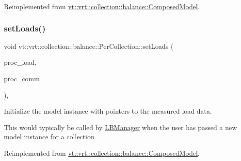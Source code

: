 Reimplemented from \hyperlink{classvt_1_1vrt_1_1collection_1_1balance_1_1_composed_model_a9410479ba5a5950fd56bb076717e48e5}{vt\+::vrt\+::collection\+::balance\+::\+Composed\+Model}.

\mbox{\label{structvt_1_1vrt_1_1collection_1_1balance_1_1_per_collection_aba8f472fbe40c44c9f0f9028afe29cfc}} 
\subsubsection{\texorpdfstring{set\+Loads()}{setLoads()}}
{\footnotesize\ttfamily void vt\+::vrt\+::collection\+::balance\+::\+Per\+Collection\+::set\+Loads (\begin{DoxyParamCaption}\item[{std\+::unordered\+\_\+map$<$ \hyperlink{namespacevt_a46ce6733d5cdbd735d561b7b4029f6d7}{Phase\+Type}, \hyperlink{namespacevt_1_1vrt_1_1collection_1_1balance_a5339303db2e1ce964d783a53fd74e6b1}{Load\+Map\+Type} $>$ const $\ast$}]{proc\+\_\+load,  }\item[{std\+::unordered\+\_\+map$<$ \hyperlink{namespacevt_a46ce6733d5cdbd735d561b7b4029f6d7}{Phase\+Type}, \hyperlink{namespacevt_1_1vrt_1_1collection_1_1balance_a10860c956804d644db54a16012352728}{Comm\+Map\+Type} $>$ const $\ast$}]{proc\+\_\+comm }\end{DoxyParamCaption})\hspace{0.3cm}{\ttfamily [override]}, {\ttfamily [virtual]}}



Initialize the model instance with pointers to the measured load data. 

This would typically be called by \hyperlink{structvt_1_1vrt_1_1collection_1_1balance_1_1_l_b_manager}{L\+B\+Manager} when the user has passed a new model instance for a collection 

Reimplemented from \hyperlink{classvt_1_1vrt_1_1collection_1_1balance_1_1_composed_model_a3a7da5e81a933ea88f87a1226fd3b401}{vt\+::vrt\+::collection\+::balance\+::\+Composed\+Model}.

\mbox{\label{structvt_1_1vrt_1_1collection_1_1balance_1_1_per_collection_a2b41fbbe2b684654f8dbfd9207b77501}} 
